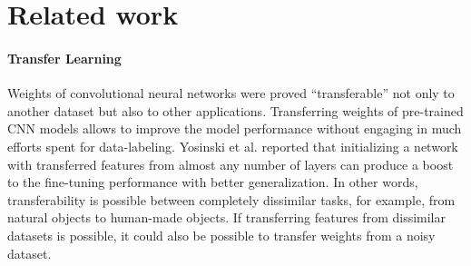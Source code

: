 \section{Related work}
\label{sec:related}

%



\paragraph{Transfer Learning}


Weights of convolutional neural networks were proved ``transferable'' not only to another dataset\cite{shin2016deep,yosinski2014transferable} but also to other applications\cite{girshick2014rich,long2015fully}.
Transferring weights of pre-trained CNN models allows to improve the model performance without engaging in much efforts spent for data-labeling.\cite{pan2010survey}
Yosinski et al.\cite{yosinski2014transferable} reported that initializing a network with transferred features from almost any number of layers can produce a boost to the fine-tuning performance with better generalization.
In other words, transferability is possible between completely dissimilar tasks, for example, from natural objects to human-made objects.
If transferring features from dissimilar datasets is possible,  it could also be possible to transfer weights from a noisy dataset.

